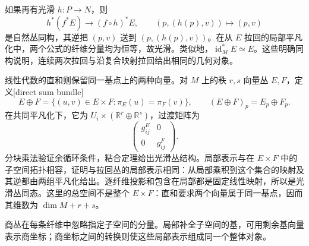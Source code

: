 \ProseParagraphBreak

如果再有光滑 \(h:P\to N\)，则
\[
	h^*(f^*E)\longrightarrow(f\circ h)^*E,
	\qquad(p,(h(p),v))\longmapsto(p,v)
\]
是自然丛同构，其逆把 \((p,v)\) 送到 \((p,(h(p),v))\)。在从 \(E\) 拉回的局部平凡化中，两个公式的纤维分量均为恒等，故光滑。类似地，\(\operatorname{id}_M^*E\simeq E\)。这些明确同构说明，连续两次拉回与沿复合映射拉回给出相同的几何对象。

\ProseParagraphBreak

线性代数的直和则保留同一基点上的两种向量。对 \(M\) 上的秩 \(r,s\) 向量丛 \(E,F\)，定义[direct sum bundle]
\[
	E\oplus F=\{(u,v)\in E\times F:\pi_E(u)=\pi_F(v)\},
	\qquad(E\oplus F)_p=E_p\oplus F_p.
\]
在共同平凡化下，它为 \(U_i\times(\mathbb R^r\oplus\mathbb R^s)\)，过渡矩阵为
\[
	\begin{pmatrix}g_{ij}^E&0\\0&g_{ij}^F\end{pmatrix}.
\]
分块乘法验证余循环条件，粘合定理给出光滑丛结构。局部表示与在 \(E\times F\) 中的子空间拓扑相容，证明与拉回丛的局部表示相同：从局部乘积到这个集合的映射及其逆都由两组平凡化给出。逐纤维投影和包含在局部都是固定线性映射，所以是光滑丛同态。这里的总空间不是整个 \(E\times F\)：直和要求两个向量属于同一基点，因而其维数为 \(\dim M+r+s\)。

\ProseParagraphBreak

商丛在每条纤维中忽略指定子空间的分量。局部补全子空间的基，可用剩余基向量表示商坐标；商坐标之间的转换则使这些局部表示组成同一个整体对象。

